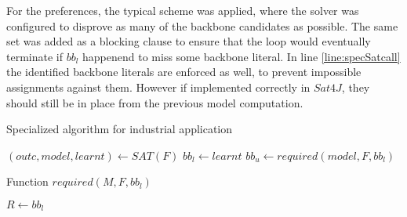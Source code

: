 For the preferences, the typical scheme was applied, where the solver was configured to disprove as many of the backbone candidates as possible. The same set was added as a blocking clause to ensure that the loop would eventually terminate if $bb_l$ happenend to miss some backbone literal. In line \ref{line:specSatcall} the identified backbone literals are enforced as well, to prevent impossible assignments against them. However if implemented correctly in $Sat4J$, they should still be in place from the previous model computation.



\begin{algorithm}
\caption{{\sc Specialized algorithm for industrial application}}
\label{alg:thoreSpecial}
\DontPrintSemicolon
{}
$(outc,model,learnt) \gets SAT(F)$\;
$bb_l \gets learnt$\;
$bb_u \gets required(model,F,bb_l)$\;
\label{line:specReq}
\end{algorithm}


\begin{algorithm}
\caption{{\sc Function $required(M,F,bb_l)$ }}
\label{alg:specReq}
\DontPrintSemicolon
{}
$R \gets bb_l$\;
\;

\end{algorithm}




